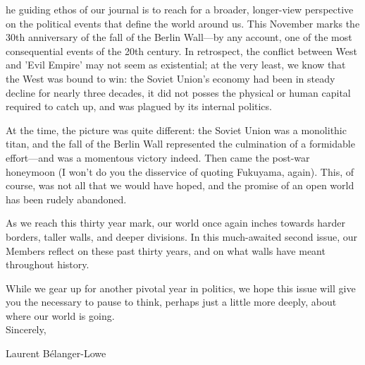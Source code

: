 

he guiding ethos of our journal is to reach for a broader, longer-view perspective on the political events that define the world around us. This November marks the 30th anniversary of the fall of the Berlin Wall---by any account, one of the most consequential events of the 20th century. In retrospect, the conflict between West and 'Evil Empire' may not seem as existential; at the very least, we know that the West was bound to win: the Soviet Union's economy had been in steady decline for nearly three decades, it did not posses the physical or human capital required to catch up, and was plagued by its internal politics.  

At the time, the picture was quite different: the Soviet Union was a monolithic titan, and the fall of the Berlin Wall represented the culmination of a formidable effort---and was a momentous victory indeed. Then came the post-war honeymoon (I won't do you the disservice of quoting Fukuyama, again). This, of course, was not all that we would have hoped, and the promise of an open world has been rudely abandoned. 

As we reach this thirty year mark, our world once again inches towards harder borders, taller walls, and deeper divisions. In this much-awaited second issue, our Members reflect on these past thirty years, and on what walls have meant throughout history. 

While we gear up for another pivotal year in politics, we hope this issue will give you the necessary to pause to think, perhaps just a little more deeply, about where our world is going. \\

Sincerely,

Laurent B\'elanger-Lowe
